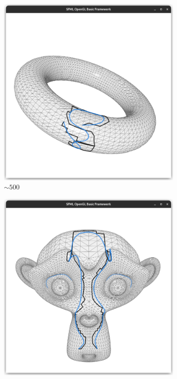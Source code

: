 \documentclass{stdlocal}
\begin{document}
\begin{figure}
  \centering
  \begin{subfigure}[b]{0.24\linewidth}
    \centering
    \includegraphics[width=\linewidth,trim={25px 20 25 50},clip]{images/torus-smooth-1.png}
    \caption{$\sim 500$}
  \end{subfigure}
  \begin{subfigure}[b]{0.24\linewidth}
    \centering
    \includegraphics[width=\linewidth,trim={25px 20 25 50},clip]{images/suzanne-smooth-1.png}

\end{subfigure}
\end{figure}
\end{document}
